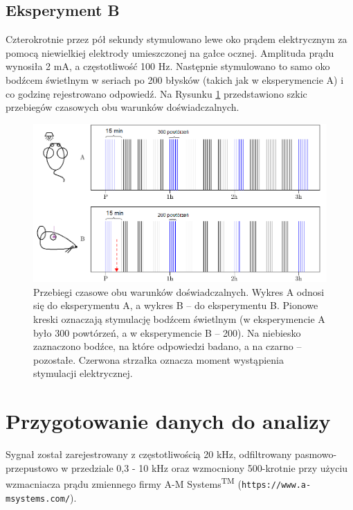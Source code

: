 \documentclass{pracamgr_2}
\begin{document}
	\subsection{Eksperyment B}
	Czterokrotnie przez pół sekundy stymulowano lewe oko prądem elektrycznym za pomocą niewielkiej elektrody umieszczonej na gałce ocznej. Amplituda prądu wynosiła 2 mA, a częstotliwość 100 Hz. Następnie stymulowano to samo oko bodźcem świetlnym w seriach po 200 błysków (takich jak w eksperymencie A) i co godzinę rejestrowano odpowiedź.
	\FloatBarrier
	Na Rysunku \ref{rys:porownanie_paradygmatow} przedstawiono szkic przebiegów czasowych obu warunków doświadczalnych. 
	\begin{figure}
		\begin{center}
			\includegraphics[width=\columnwidth]{przebieg.png}
		\end{center}
		\caption{Przebiegi czasowe obu warunków doświadczalnych. Wykres A odnosi się do eksperymentu A, a wykres B -- do eksperymentu B. Pionowe kreski oznaczają stymulację bodźcem świetlnym (w eksperymencie A było 300 powtórzeń, a w eksperymencie B -- 200). Na niebiesko zaznaczono bodźce, na które odpowiedzi badano, a na czarno -- pozostałe. Czerwona strzałka oznacza moment wystąpienia stymulacji elektrycznej.}
		\label{rys:porownanie_paradygmatow}
	\end{figure}
	\FloatBarrier
	\section{Przygotowanie danych do analizy}
	Sygnał został zarejestrowany z częstotliwością 20 kHz, odfiltrowany pasmowo-przepustowo w przedziale 0,3 - 10 kHz oraz wzmocniony 500-krotnie przy użyciu wzmacniacza prądu zmiennego firmy A-M Systems\textsuperscript{TM} (\texttt{https://www.a-msystems.com/}).
	
\end{document}
